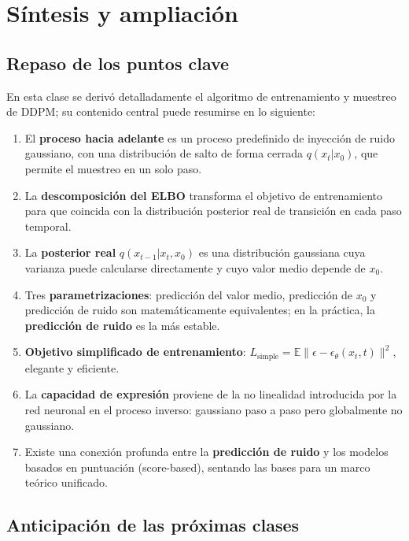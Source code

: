 \section{Síntesis y ampliación}

\subsection{Repaso de los puntos clave}

En esta clase se derivó detalladamente el algoritmo de entrenamiento y muestreo de DDPM; su contenido central puede resumirse en lo siguiente:

\begin{enumerate}
    \item El \textbf{proceso hacia adelante} es un proceso predefinido de inyección de ruido gaussiano, con una distribución de salto de forma cerrada $q(x_t|x_0)$, que permite el muestreo en un solo paso.
    \item La \textbf{descomposición del ELBO} transforma el objetivo de entrenamiento para que coincida con la distribución posterior real de transición en cada paso temporal.
    \item La \textbf{posterior real} $q(x_{t-1}|x_t, x_0)$ es una distribución gaussiana cuya varianza puede calcularse directamente y cuyo valor medio depende de $x_0$.
    \item Tres \textbf{parametrizaciones}: predicción del valor medio, predicción de $x_0$ y predicción de ruido son matemáticamente equivalentes; en la práctica, la \textbf{predicción de ruido} es la más estable.
    \item \textbf{Objetivo simplificado de entrenamiento}: $L_{\text{simple}} = \mathbb{E}\|\epsilon - \epsilon_\theta(x_t, t)\|^2$, elegante y eficiente.
    \item La \textbf{capacidad de expresión} proviene de la no linealidad introducida por la red neuronal en el proceso inverso: gaussiano paso a paso pero globalmente no gaussiano.
    \item Existe una conexión profunda entre la \textbf{predicción de ruido} y los modelos basados en puntuación (score-based), sentando las bases para un marco teórico unificado.
\end{enumerate}

\subsection{Anticipación de las próximas clases}

